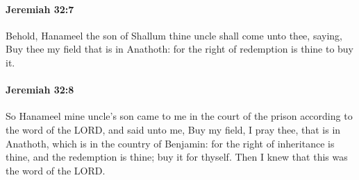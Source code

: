 		\paragraph{Jeremiah 32:7} %
			\label{JEREMIAH-32-7}

			Behold, Hanameel the son of Shallum thine uncle shall come unto thee, saying, Buy thee my field that is in Anathoth: for the right of redemption is thine to buy it.


		\paragraph{Jeremiah 32:8} %
			\label{JEREMIAH-32-8}

			So Hanameel mine uncle’s son came to me in the court of the prison according to the word of the LORD, and said unto me, Buy my field, I pray thee, that is in Anathoth, which is in the country of Benjamin: for the right of inheritance is thine, and the redemption is thine; buy it for thyself. Then I knew that this was the word of the LORD.

